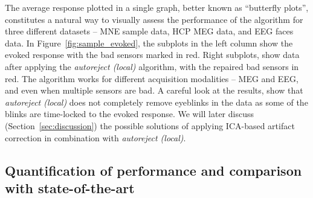 The average response plotted in a single graph, better known as ``butterfly plots'', constitutes a natural way to visually assess the performance of the algorithm for three different datasets -- MNE sample data, HCP MEG data, and EEG faces data. In Figure~\ref{fig:sample_evoked}, the subplots in the left column show the evoked response with the bad sensors marked in red. Right subplots, show data after applying the \emph{autoreject (local)} algorithm, with the repaired bad sensors in red. The algorithm works for different acquisition modalities -- MEG and EEG, and even when multiple sensors are bad. A careful look at the results, show that \emph{autoreject (local)} does not completely remove eyeblinks in the data as some of the blinks are time-locked to the evoked response. We will later discuss (Section~\ref{sec:discussion}) the possible solutions of applying ICA-based artifact correction in combination with \emph{autoreject (local)}.

\subsection{Quantification of performance and comparison with state-of-the-art}
\label{sec:benchmark_sensors}

